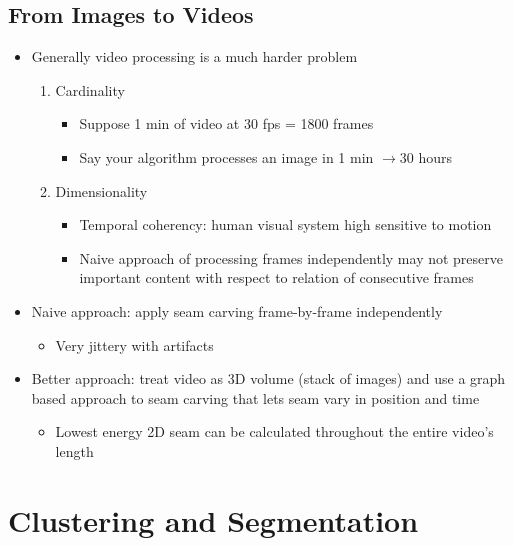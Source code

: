 \documentclass[letterpaper,12pt]{article}
\newcommand{\lra}{\ensuremath{\longrightarrow{}}}
\begin{document}
\subsection{From Images to Videos}
\begin{itemize}
 \item Generally video processing is a much harder problem
       \begin{enumerate}
        \item Cardinality
              \begin{itemize}
               \item Suppose 1 min of video at 30 fps = 1800 frames
               \item Say your algorithm processes an image in 1 min \lra 30 hours
              \end{itemize}
        \item Dimensionality
              \begin{itemize}
               \item Temporal coherency: human visual system high sensitive to motion
               \item Naive approach of processing frames independently may not preserve important content with respect to relation of consecutive frames
              \end{itemize}
       \end{enumerate}
 \item Naive approach: apply seam carving frame-by-frame independently
       \begin{itemize}
        \item Very jittery with artifacts
       \end{itemize}
 \item Better approach: treat video as 3D volume (stack of images) and use a graph based approach to seam carving that lets seam vary in position and time
       \begin{itemize}
        \item Lowest energy 2D seam can be calculated throughout the entire video's length
       \end{itemize}
\end{itemize}

\section{Clustering and Segmentation}
\end{document}
